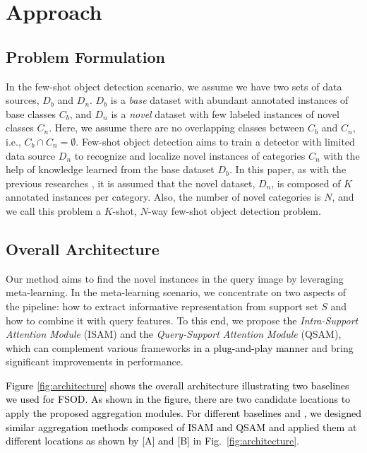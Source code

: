 \documentclass[10pt,twocolumn,letterpaper]{article}
\newcommand{\nj}[1]{\textcolor{black}{#1}}
\newcommand{\hj}[1]{\textcolor{black}{#1}}
\begin{document}
\section{Approach}
\label{sec:approach}
\subsection{Problem Formulation}
\label{sec:problem formulation}
In the few-shot object detection scenario, we assume we have two sets of data sources, $D_{b}$ and $D_{n}$. $D_{b}$ is a \textit{base} dataset with abundant annotated instances of base classes $C_{b}$, and $D_{n}$ is a \textit{novel} dataset with few labeled instances of novel classes $C_{n}$. Here, \nj{we assume} there are no overlapping classes between $C_{b}$ and $C_{n}$, i.e., $C_{b} \cap C_{n} = \emptyset$. Few-shot object detection aims to train a detector with limited data source $D_{n}$ to recognize and localize novel instances of categories $C_{n}$ with the help of knowledge learned from the base dataset $D_{b}$.
In this paper, as with the previous researches \cite{li2019few, kang2019few, xiao2020few, wang2020frustratingly}, it is assumed that the novel dataset, $D_{n}$, is composed of $K$ annotated instances per category. Also, the number of novel categories is $N$, and we call this problem a $K$-shot, $N$-way few-shot object detection problem. 




\subsection{Overall Architecture}
\label{subsec:overall}

Our method aims to find the novel instances in the query image by leveraging meta-learning. In the meta-learning scenario, we concentrate on two aspects of the pipeline: how to extract informative representation from support set $S$ and how to combine it with query features. To this end, we propose \nj{the} \textit{Intra-Support Attention Module} (ISAM) and \nj{the} \textit{Query-Support Attention Module} (QSAM), which \nj{can} complement various frameworks \nj{in a plug-and-play manner} and bring significant improvements in performance. 

\hj{Figure \ref{fig:architecture} shows the overall architecture illustrating two baselines \cite{fan2020fsod, xiao2020few} we used \nj{for FSOD}. As shown in the figure, there are two candidate \nj{locations} to apply the \nj{proposed} aggregation \nj{modules}. \nj{For different baselines \cite{fan2020fsod} and \cite{xiao2020few}, we designed similar aggregation methods composed of ISAM and QSAM and applied them at different locations as shown by [A] and [B] in Fig.~\ref{fig:architecture}}.} 
\end{document}
